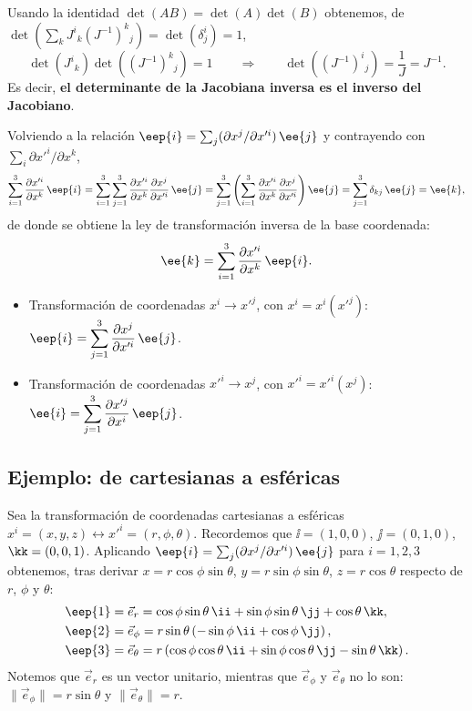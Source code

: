 Usando la identidad $\det(AB)=\det(A)\det(B)$ obtenemos, de $\det\!\left(\sum_k J^i{}_k(J^{-1})^k{}_j\right) = \det(\delta^i_j)=1$,
\begin{equation}
\det\!\left(J^i{}_k\right)\det\!\left((J^{-1})^k{}_j\right) = 1
\qquad\Longrightarrow\qquad
\det\!\left((J^{-1})^i{}_j\right) = \frac{1}{J} = J^{-1}.
\end{equation}
Es decir, \textbf{el determinante de la Jacobiana inversa es el inverso del Jacobiano}.

Volviendo a la relación $\eep{i}=\sum_j (\partial x^j/\partial x'^i)\,\ee{j}$ y contrayendo con $\sum_i \partial x'^i/\partial x^k$,
\begin{equation}
\sum_{i=1}^3 \frac{\partial x'^i}{\partial x^k}\,\eep{i}
= \sum_{i=1}^3\sum_{j=1}^3 \frac{\partial x'^i}{\partial x^k}\frac{\partial x^j}{\partial x'^i}\,\ee{j}
= \sum_{j=1}^3\left(\sum_{i=1}^3\frac{\partial x'^i}{\partial x^k}\frac{\partial x^j}{\partial x'^i}\right)\ee{j}
= \sum_{j=1}^3 \delta_{kj}\,\ee{j} = \ee{k},
\end{equation}
de donde se obtiene la ley de transformación inversa de la base coordenada:
\begin{equation}
\ee{k} = \sum_{i=1}^{3} \frac{\partial x'^i}{\partial x^k}\, \eep{i}.
\end{equation}

\begin{observacion}[Resumen]
\begin{itemize}
\item Transformación de coordenadas $x^i\to x'^j$, con $x^i=x^i(x'^j)$: \quad $\displaystyle \eep{i} = \sum_{j=1}^3 \frac{\partial x^j}{\partial x'^i}\,\ee{j}$.
\item Transformación de coordenadas $x'^i\to x^j$, con $x'^i=x'^i(x^j)$: \quad $\displaystyle \ee{i} = \sum_{j=1}^3 \frac{\partial x'^j}{\partial x^i}\,\eep{j}$.
\end{itemize}
\end{observacion}

\subsection{Ejemplo: de cartesianas a esféricas}

Sea la transformación de coordenadas cartesianas a esféricas $x^i=(x,y,z)\leftrightarrow x'^i=(r,\phi,\theta)$. Recordemos que $\ii=(1,0,0)$, $\jj=(0,1,0)$, $\kk=(0,0,1)$. Aplicando $\eep{i}=\sum_j (\partial x^j/\partial x'^i)\,\ee{j}$ para $i=1,2,3$ obtenemos, tras derivar $x=r\cos\phi\sin\theta$, $y=r\sin\phi\sin\theta$, $z=r\cos\theta$ respecto de $r$, $\phi$ y $\theta$:
\begin{align}
\eep{1} &= \vec e_r = \cos\phi\sin\theta\,\ii + \sin\phi\sin\theta\,\jj + \cos\theta\,\kk, \\
\eep{2} &= \vec e_\phi = r\sin\theta\left(-\sin\phi\,\ii + \cos\phi\,\jj\right), \\
\eep{3} &= \vec e_\theta = r\left(\cos\phi\cos\theta\,\ii + \sin\phi\cos\theta\,\jj - \sin\theta\,\kk\right).
\end{align}
Notemos que $\vec e_r$ es un vector unitario, mientras que $\vec e_\phi$ y $\vec e_\theta$ no lo son: $\|\vec e_\phi\|=r\sin\theta$ y $\|\vec e_\theta\|=r$.

